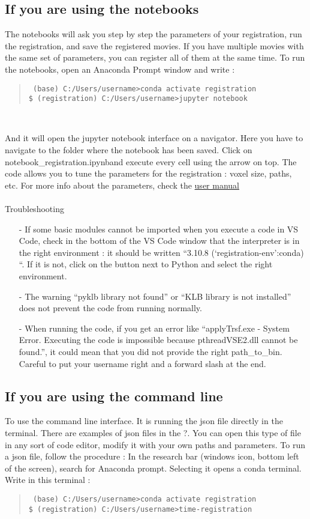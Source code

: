 \documentclass[10pt,a4paper]{book}
\newenvironment{code}[1]{\mbox{}\\[1ex]\hspace*{-#1cm}\begin{minipage}{150mm}\begin{quote}\tt}{\end{quote}\end{minipage}\mbox{}\\[1ex]}
\begin{document}
\subsection{If you are using the notebooks}
The notebooks will ask you step by step the parameters of your registration, run the registration, and save the registered movies. If you have multiple movies with the same set of parameters, you can register all of them at the same time. To run the notebooks, open an Anaconda Prompt window and write :
\begin{code}{0.8}
\$ (base) C:/Users/username>conda activate registration \\
\$ (registration) C:/Users/username>jupyter notebook
\end{code}

And it will open the jupyter notebook interface on a navigator.
Here you have to navigate to the folder where the notebook has been saved.
Click on notebook\_registration.ipynband execute every  cell using the arrow on top.
The code allows you to tune the parameters for the registration : voxel size, paths, etc.
For more info about the parameters, check the \href{https:/github.com/GuignardLab/registration-tools/blob/master/User-manual/user-manual.pdf}{user manual}

\paragraph{}Troubleshooting
\begin{itemize}
\item[-]If some basic modules cannot be imported when you execute a code in VS Code, check in the bottom of the VS Code window that the interpreter is in the right environment : it should be written “3.10.8 (‘registration-env’:conda) “. If it is not, click on the button next to Python and select the right environment. 
\item[-]The warning “pyklb library not found” or “KLB library is not installed” does not prevent the code from running normally. 
\item[-]When running the code, if you get an error like “applyTrsf.exe - System Error. Executing the code is impossible because pthreadVSE2.dll cannot be found.”, it could mean that you did not provide the right path\_to\_bin. Careful to put your username right and a forward slash at the end.
\end{itemize}
\subsection{If you are using the command line}
To use the command line interface. It is running the json file directly in the terminal. There are examples of json files in the ?. You can open this type of file in any sort of code editor, modify it with your own paths and parameters. To run a json file, follow the procedure : In the research bar (windows icon, bottom left of the screen), search for Anaconda prompt. Selecting it opens a conda terminal. Write in this terminal :
\begin{code}{0.8}
\$ (base) C:/Users/username>conda activate registration \\
\$ (registration) C:/Users/username>time-registration
\end{code}
\end{document}
